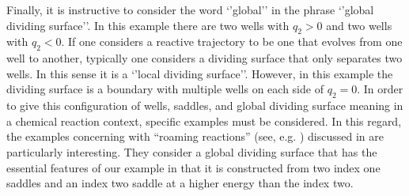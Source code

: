 \documentclass{article}
\begin{document}
Finally, it is instructive to consider the word `'global'' in the phrase `'global dividing surface''. In this example there are two wells with $q_2 >0$ and two wells with $q_2 <0$. If one considers a reactive trajectory to be one that evolves from one well to another, typically one considers a dividing surface that only separates two wells. In this sense it is a `'local dividing surface''. However, in this example the dividing surface  is a boundary with multiple wells on each side of $q_2=0$. In order to give this configuration of wells, saddles, and global dividing surface meaning in a chemical reaction context, specific examples must be considered.  In this regard, the examples concerning with ``roaming reactions''  (see, e.g. \cite{Bowman2011Suits, bowman2011roaming}) discussed  in \cite{Shepler2011roaming, Harding_et_al_2012} are particularly interesting. They consider a global dividing surface that has the essential features of our example in that it is constructed from two index one saddles and an index two saddle at a higher energy than the index two. 









\end{document}
